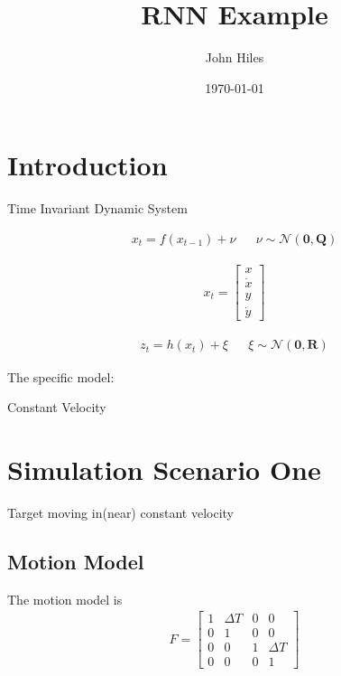 \documentclass{article}
\title{RNN Example}
\author{John Hiles}
\date\today
\begin{document}
\maketitle %



\section{Introduction}

Time Invariant Dynamic System

\begin{align*}
x_{t} = f(x_{t-1}) + \nu && \nu \sim \mathcal{N}(\mathbf{0},\mathbf{Q})
\end{align*}

\begin{align*}
x_{t} = \begin{bmatrix} x \\
\dot{x} \\
y \\
\dot{y} \end{bmatrix}
\end{align*}

\begin{align*}
z_t = h(x_t) + \xi && \xi \sim \mathcal{N}(\mathbf{0}, \mathbf{R})
\end{align*}

The specific model:

Constant Velocity



\section{Simulation Scenario One}

Target moving in(near) constant velocity 

\subsection{Motion Model}
The motion model is
\begin{align*}
F = \begin{bmatrix} 1 & \Delta T & 0 & 0 \\
				    0 & 1 & 0 & 0 \\
				    0 & 0 & 1 & \Delta T \\
				    0 & 0 & 0 & 1
	\end{bmatrix}
\end{align*}
\end{document}
